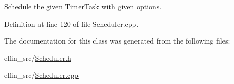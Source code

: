 Schedule the given \hyperlink{class_e_l_f_i_n_1_1_timer_task}{Timer\-Task} with given options. 



Definition at line 120 of file Scheduler.\-cpp.



The documentation for this class was generated from the following files\-:\begin{DoxyCompactItemize}
\item 
elfin\-\_\-src/\hyperlink{_scheduler_8h}{Scheduler.\-h}\item 
elfin\-\_\-src/\hyperlink{_scheduler_8cpp}{Scheduler.\-cpp}\end{DoxyCompactItemize}
